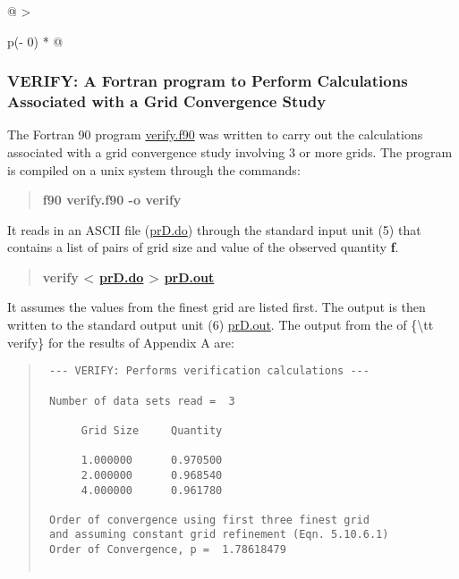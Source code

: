 \begin{longtable}[]{@{}
  >{\raggedright\arraybackslash}p{(\columnwidth - 0\tabcolsep) * }@{}}
\begin{minipage}[t]{\linewidth}
\hypertarget{verify-a-fortran-program-to-perform-calculations-associated-with-a-grid-convergence-study}{%
\subsubsection{VERIFY: A Fortran program to Perform Calculations
Associated with a Grid Convergence
Study}\label{verify-a-fortran-program-to-perform-calculations-associated-with-a-grid-convergence-study}}

The Fortran 90 program
\href{https://www.grc.nasa.gov/www/wind/valid/tutorial/verify.f90}{verify.f90}
was written to carry out the calculations associated with a grid
convergence study involving 3 or more grids. The program is compiled on
a unix system through the commands:

\begin{quote}
\textbf{f90 verify.f90 -o verify}
\end{quote}

It reads in an ASCII file
(\href{https://www.grc.nasa.gov/www/wind/valid/tutorial/prD.do}{prD.do})
through the standard input unit (5) that contains a list of pairs of
grid size and value of the observed quantity \textbf{f}.

\begin{quote}
\textbf{verify \textless{}
\href{https://www.grc.nasa.gov/www/wind/valid/tutorial/prD.do}{prD.do}
\textgreater{}
\href{https://www.grc.nasa.gov/www/wind/valid/tutorial/prD.out}{prD.out}}
\end{quote}

It assumes the values from the finest grid are listed first. The output
is then written to the standard output unit (6)
\href{https://www.grc.nasa.gov/www/wind/valid/tutorial/prD.out}{prD.out}.
The output from the of \{\textbackslash tt verify\} for the results of
Appendix A are:

\begin{quote}
\begin{verbatim}
 --- VERIFY: Performs verification calculations ---
  
 Number of data sets read =  3
  
      Grid Size     Quantity
  
      1.000000      0.970500
      2.000000      0.968540
      4.000000      0.961780
  
 Order of convergence using first three finest grid 
 and assuming constant grid refinement (Eqn. 5.10.6.1) 
 Order of Convergence, p =  1.78618479
  

\end{verbatim}
\end{quote}
\end{minipage}
\end{longtable}
